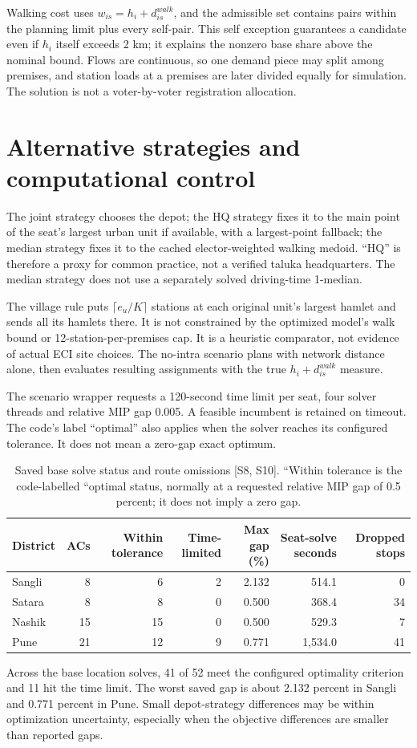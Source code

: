 \documentclass[11pt,a4paper,oneside]{report}
\newcommand{\source}[1]{\par\nopagebreak[4]{\footnotesize\color{teal}Evidence: #1.}\par}
\begin{document}
Walking cost uses $w_{is}=h_i+d^{walk}_{is}$, and the admissible set contains pairs within the planning limit plus every self-pair. This self exception guarantees a candidate even if $h_i$ itself exceeds 2 km; it explains the nonzero base share above the nominal bound. Flows are continuous, so one demand piece may split among premises, and station loads at a premises are later divided equally for simulation. The solution is not a voter-by-voter registration allocation.
\source{[S8]}

\section{Alternative strategies and computational control}
The joint strategy chooses the depot; the HQ strategy fixes it to the main point of the seat's largest urban unit if available, with a largest-point fallback; the median strategy fixes it to the cached elector-weighted walking medoid. ``HQ'' is therefore a proxy for common practice, not a verified taluka headquarters. The median strategy does not use a separately solved driving-time 1-median.

The village rule puts $\lceil e_u/K\rceil$ stations at each original unit's largest hamlet and sends all its hamlets there. It is not constrained by the optimized model's walk bound or 12-station-per-premises cap. It is a heuristic comparator, not evidence of actual ECI site choices. The no-intra scenario plans with network distance alone, then evaluates resulting assignments with the true $h_i+d^{walk}_{is}$ measure.

The scenario wrapper requests a 120-second time limit per seat, four solver threads and relative MIP gap 0.005. A feasible incumbent is retained on timeout. The code's label ``optimal'' also applies when the solver reaches its configured tolerance. It does not mean a zero-gap exact optimum.
\begin{table}[htbp]\centering
\small
\setlength{\tabcolsep}{5pt}
\caption{Saved base solve status and route omissions [S8, S10]. ``Within tolerance is the code-labelled ``optimal status, normally at a requested relative MIP gap of 0.5 percent; it does not imply a zero gap.}
\begin{tabular}{lrrrrrr}
\toprule
District & ACs & Within tolerance & Time-limited & Max gap (\%) & Seat-solve seconds & Dropped stops\\
\midrule
Sangli & 8 & 6 & 2 & 2.132 & 514.1 & 0\\
Satara & 8 & 8 & 0 & 0.500 & 368.4 & 34\\
Nashik & 15 & 15 & 0 & 0.500 & 529.3 & 7\\
Pune & 21 & 12 & 9 & 0.771 & 1,534.0 & 41\\
\bottomrule\end{tabular}
\end{table}
Across the base location solves, 41 of 52 meet the configured optimality criterion and 11 hit the time limit. The worst saved gap is about 2.132 percent in Sangli and 0.771 percent in Pune. Small depot-strategy differences may be within optimization uncertainty, especially when the objective differences are smaller than reported gaps.
\source{[S8], [S9]}
\end{document}
